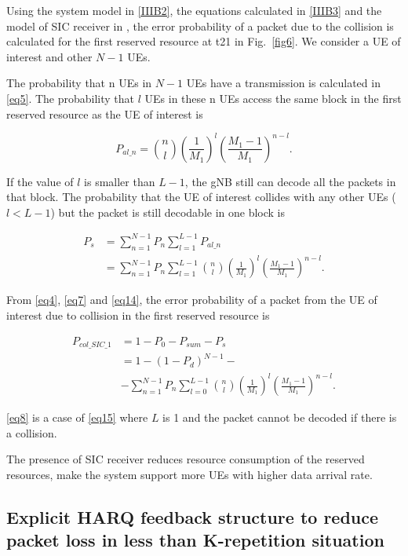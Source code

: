 \documentclass{ieeeaccess}
\begin{document}
Using the system model in \ref{IIIB2}, the equations calculated in \ref{IIIB3} and the model of SIC receiver in \cite{ref21} , the error probability of a packet due to the collision is calculated for the first reserved resource at t21 in Fig.~\ref{fig6}. We consider a UE of interest and other $N-1$ UEs.

The probability that n UEs in $N-1$ UEs have a transmission is calculated in \eqref{eq5}. The probability that $l$ UEs in these n UEs access the same block in the first reserved resource as the UE of interest is

\begin{equation}
P_{al\_n} = \binom {n}{l}(\frac{1}{M_{1}})^{l}
(\frac {M_{1}-1}{M_{1}})^{n-l}.\label{eq13}
\end{equation}

If the value of $l$ is smaller than $L-1$, the gNB still can decode all the packets in that block. The probability that the UE of interest collides with any other UEs ($l<L-1$) but the packet is still decodable in one block is

\begin{align}
P_{s} &= \sum_{n=1}^{N-1} P_{n}\sum_{l=1}^{L-1}P_{al\_n} \nonumber\\
 &= \sum_{n=1}^{N-1} P_{n}\sum_{l=1}^{L-1}\binom {n}{l}(\frac{1}{M_{1}})^{l}
(\frac {M_{1}-1}{M_{1}})^{n-l}.\label{eq14}
\end{align}

From \eqref{eq4}, \eqref{eq7} and \eqref{eq14}, the error probability of a packet from the UE of interest due to collision in the first reserved resource is

\begin{align}
P_{col\_SIC\_1} &= 1 - P_{0} - P_{sum} - P_{s} \nonumber\\
 &= 1- (1-P_{d})^{N-1} - \nonumber\\
 &- \sum_{n=1}^{N-1} P_{n}\sum_{l=0}^{L-1}\binom {n}{l}(\frac{1}{M_{1}})^{l}
(\frac {M_{1}-1}{M_{1}})^{n-l}.\label{eq15}
\end{align}

\eqref{eq8} is a case of \eqref{eq15} where $L$ is 1 and the packet cannot be decoded if there is a collision. 

The presence of SIC receiver reduces resource consumption of the reserved resources, make the system support more UEs with higher data arrival rate.

\subsection{Explicit HARQ feedback structure to reduce packet loss in less than K-repetition situation}\label{IIIC}
\end{document}
